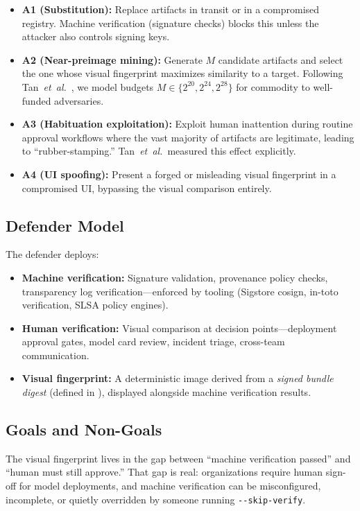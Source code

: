 \documentclass[conference,10pt]{IEEEtran}
\newcommand{\etal}{\textit{et~al.}}
\begin{document}
\begin{itemize}[leftmargin=*,nosep]
  \item \textbf{A1 (Substitution):} Replace artifacts in transit or in a compromised registry. Machine verification (signature checks) blocks this unless the attacker also controls signing keys.
  \item \textbf{A2 (Near-preimage mining):} Generate $M$ candidate artifacts and select the one whose visual fingerprint maximizes similarity to a target. Following Tan~\etal~\cite{tan2017unicorns}, we model budgets $M \in \{2^{20}, 2^{24}, 2^{28}\}$ for commodity to well-funded adversaries.
  \item \textbf{A3 (Habituation exploitation):} Exploit human inattention during routine approval workflows where the vast majority of artifacts are legitimate, leading to ``rubber-stamping.'' Tan~\etal\ measured this effect explicitly.
  \item \textbf{A4 (UI spoofing):} Present a forged or misleading visual fingerprint in a compromised UI, bypassing the visual comparison entirely.
\end{itemize}

\subsection{Defender Model}

The defender deploys:
\begin{itemize}[leftmargin=*,nosep]
  \item \textbf{Machine verification:} Signature validation, provenance policy checks, transparency log verification---enforced by tooling (Sigstore cosign, in-toto verification, SLSA policy engines).
  \item \textbf{Human verification:} Visual comparison at decision points---deployment approval gates, model card review, incident triage, cross-team communication.
  \item \textbf{Visual fingerprint:} A deterministic image derived from a \emph{signed bundle digest} (defined in ), displayed alongside machine verification results.
\end{itemize}

\subsection{Goals and Non-Goals}

The visual fingerprint lives in the gap between ``machine verification passed'' and ``human must still approve.''
That gap is real: organizations require human sign-off for model deployments, and machine verification can be misconfigured, incomplete, or quietly overridden by someone running \texttt{-{}-skip-verify}.
\end{document}
